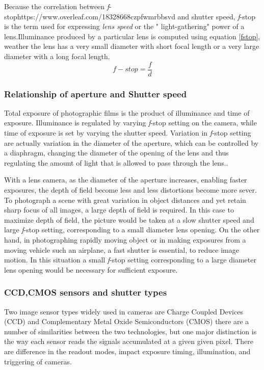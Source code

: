 Because the correlation between \textit{f}-stophttps://www.overleaf.com/18328668czpfwmrbbsvd and shutter speed, \textit{f}-stop is the term used for expressing \textit{lens speed} or the " light-gathering" power of a lens.Illuminance produced by a particular lens is computed using equation \ref{fstop}, weather the lens has a very small diameter with short focal length or a very large diameter with a long focal length.\cite{elements_photogrammetry}
\begin{equation}
f-stop=\frac{f}{d}
\label{fstop}
\end{equation}
\subsubsection{Relationship of aperture and Shutter speed}
Total exposure of photographic films is the product of illuminance and time of exposure.
Illuminance is regulated by varying \textit{f}-stop setting on the camera, while time of exposure is set by varying the shutter speed. Variation in \textit{f}-stop setting are actually variation in the diameter of the aperture, which can be controlled by a diaphragm, changing the diameter of the opening of the lens and thus regulating the amount of light that is allowed to pass through the lens.\cite{elements_photogrammetry}.

With a lens camera, as the diameter of the aperture increases, enabling faster exposures, the depth of field become less and less distortions become more sever. To photograph a scene with great variation in object distances and yet retain sharp focus of all images, a large depth of field is required. In this case to maximize depth of field, the picture would be taken at a slow shutter speed and large \textit{f}-stop setting, corresponding to a small diameter lens opening. On the other hand, in photographing rapidly moving object or in making exposures from a moving vehicle such an airplane, a fast shutter is essential, to reduce image motion. In this situation a small \textit{f}-stop setting corresponding to a large diameter lens opening would be necessary for sufficient exposure.\cite{Planning_airborne}
\subsubsection{CCD,CMOS sensors and shutter types}
Two image sensor types widely used in cameras are Charge Coupled Devices (CCD) and Complementary Metal Oxide Semiconductors (CMOS) there are a number of similarities between the two technologies, but one major distinction is the way each sensor reads the signals accumulated at a given given pixel. There are difference in the readout modes, impact exposure timing, illumination, and triggering of cameras.

